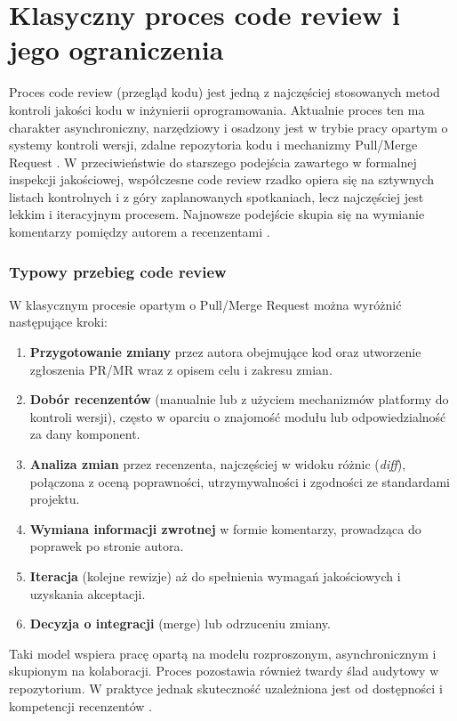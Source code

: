\section{Klasyczny proces code review i jego ograniczenia}
\label{section:classic-code-review}

Proces code review (przegląd kodu) jest jedną z najczęściej stosowanych metod kontroli jakości kodu w inżynierii oprogramowania.
Aktualnie proces ten ma charakter asynchroniczny, narzędziowy i osadzony jest w trybie pracy opartym o 
systemy kontroli wersji, zdalne repozytoria kodu i mechanizmy Pull/Merge Request \cite{bacchelli2013}.
W przeciwieństwie do starszego podejścia zawartego w formalnej inspekcji jakościowej, współczesne code review rzadko opiera się na
sztywnych listach kontrolnych i z góry zaplanowanych spotkaniach, lecz najczęściej jest lekkim i iteracyjnym procesem.
Najnowsze podejście skupia się na wymianie komentarzy pomiędzy autorem a recenzentami \cite{bacchelli2013, badampudi2023}.

\subsubsection*{Typowy przebieg code review}
W klasycznym procesie opartym o Pull/Merge Request można wyróżnić następujące kroki:
\begin{enumerate}
    \item \textbf{Przygotowanie zmiany} przez autora obejmujące kod oraz utworzenie zgłoszenia PR/MR wraz z opisem celu i zakresu zmian.
    \item \textbf{Dobór recenzentów} (manualnie lub z użyciem mechanizmów platformy do kontroli wersji), często w oparciu o znajomość modułu lub odpowiedzialność za dany komponent.
    \item \textbf{Analiza zmian} przez recenzenta, najczęściej w widoku różnic (\emph{diff}), połączona z oceną poprawności, utrzymywalności i zgodności ze standardami projektu.
    \item \textbf{Wymiana informacji zwrotnej} w formie komentarzy, prowadząca do poprawek po stronie autora.
    \item \textbf{Iteracja} (kolejne rewizje) aż do spełnienia wymagań jakościowych i uzyskania akceptacji.
    \item \textbf{Decyzja o integracji} (merge) lub odrzuceniu zmiany.
\end{enumerate}
Taki model wspiera pracę opartą na modelu rozproszonym, asynchronicznym i skupionym na kolaboracji. Proces pozostawia również 
twardy ślad audytowy w repozytorium. W praktyce jednak skuteczność uzależniona jest od dostępności i kompetencji recenzentów \cite{badampudi2023}.

